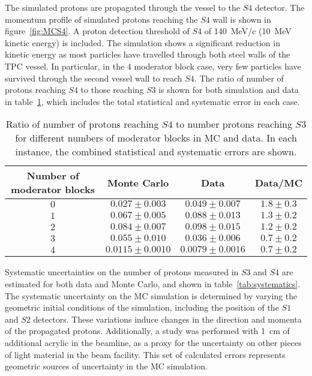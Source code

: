 The simulated protons are propagated through the vessel to the $\mathit{S4}$ detector.
The momentum profile of simulated protons reaching the $\mathit{S4}$ wall is shown in figure~\ref{fig:MCS4}.
A proton detection threshold of $\mathit{S4}$ of 140~MeV/c (10~MeV kinetic energy) is included.
The simulation shows a significant reduction in kinetic energy as most particles have travelled through both steel walls of the TPC vessel.
In particular, in the 4 moderator block case, very few particles have survived through the second vessel wall to reach $\mathit{S4}$.
The ratio of number of protons reaching $\mathit{S4}$ to those reaching $\mathit{S3}$ is shown for both simulation and data in table~\ref{tab:ratios}, which includes the total statistical and systematic error in each case.

\begin{table}
	\centering
	\caption{Ratio of number of protons reaching $\mathit{S4}$ to number protons reaching $\mathit{S3}$ for different numbers of moderator blocks in MC and data. In each instance, the combined statistical and systematic errors are shown.}
	\begin{tabular}{|c|c|c|c|}
		\hline 
		Number of moderator blocks & Monte Carlo & Data & Data/MC\\
		\hline
		$0$ & $0.027 \pm 0.003$ & $0.049 \pm 0.007$ & $1.8 \pm 0.3$ \\
		$1$ & $0.067 \pm 0.005$ & $0.088 \pm 0.013$ & $1.3 \pm 0.2$ \\
		$2$ & $0.084 \pm 0.007$ & $0.098 \pm 0.015$ & $1.2 \pm 0.2$ \\
		$3$ & $0.055 \pm 0.010$ & $0.036 \pm 0.006$ & $0.7 \pm 0.2$ \\
		$4$ & $0.0115 \pm 0.0010$ & $0.0079 \pm 0.0016$ & $0.7 \pm 0.2$ \\
		\hline
	\end{tabular}
	\label{tab:ratios}
\end{table}

Systematic uncertainties on the number of protons measured in $\mathit{S3}$ and $\mathit{S4}$ are estimated for both data and Monte Carlo, and shown in table~\ref{tab:systematics}.
The systematic uncertainty on the MC simulation is determined by varying the geometric initial conditions of the simulation, including the position of the $\mathit{S1}$ and $\mathit{S2}$ detectors.
These variations induce changes in the direction and momenta of the propagated protons.
Additionally, a study was performed with 1~cm of additional acrylic in the beamline, as a proxy for the uncertainty on other pieces of light material in the beam facility.
This set of calculated errors represents geometric sources of uncertainty in the MC simulation.

